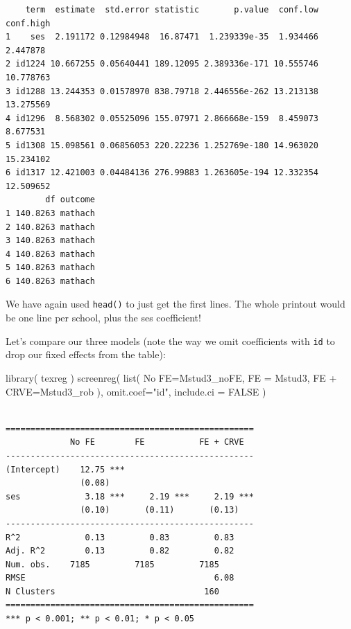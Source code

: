 \documentclass[
  letterpaper,
  DIV=11,
  numbers=noendperiod]{scrreprt}
\newenvironment{Shaded}{\begin{snugshade}}{\end{snugshade}}
\newcommand{\AttributeTok}[1]{\textcolor[rgb]{0.49,0.56,0.16}{#1}}
\newcommand{\ConstantTok}[1]{\textcolor[rgb]{0.53,0.00,0.00}{#1}}
\newcommand{\FunctionTok}[1]{\textcolor[rgb]{0.02,0.16,0.49}{#1}}
\newcommand{\NormalTok}[1]{\textcolor[rgb]{0.00,0.44,0.13}{#1}}
\newcommand{\OtherTok}[1]{\textcolor[rgb]{0.00,0.44,0.13}{#1}}
\newcommand{\StringTok}[1]{\textcolor[rgb]{0.25,0.44,0.63}{#1}}
\begin{document}
\begin{verbatim}
    term  estimate  std.error statistic       p.value  conf.low conf.high
1    ses  2.191172 0.12984948  16.87471  1.239339e-35  1.934466  2.447878
2 id1224 10.667255 0.05640441 189.12095 2.389336e-171 10.555746 10.778763
3 id1288 13.244353 0.01578970 838.79718 2.446556e-262 13.213138 13.275569
4 id1296  8.568302 0.05525096 155.07971 2.866668e-159  8.459073  8.677531
5 id1308 15.098561 0.06856053 220.22236 1.252769e-180 14.963020 15.234102
6 id1317 12.421003 0.04484136 276.99883 1.263605e-194 12.332354 12.509652
        df outcome
1 140.8263 mathach
2 140.8263 mathach
3 140.8263 mathach
4 140.8263 mathach
5 140.8263 mathach
6 140.8263 mathach
\end{verbatim}

We have again used \texttt{head()} to just get the first lines. The
whole printout would be one line per school, plus the ses coefficient!

Let's compare our three models (note the way we omit coefficients with
\texttt{id} to drop our fixed effects from the table):

\begin{Shaded}
\begin{Highlighting}[]
\FunctionTok{library}\NormalTok{( texreg )}
\FunctionTok{screenreg}\NormalTok{( }\FunctionTok{list}\NormalTok{( }\StringTok{\textasciigrave{}}\AttributeTok{No FE}\StringTok{\textasciigrave{}}\OtherTok{=}\NormalTok{Mstud3\_noFE, }\StringTok{\textasciigrave{}}\AttributeTok{FE}\StringTok{\textasciigrave{}} \OtherTok{=}\NormalTok{ Mstud3, }\StringTok{\textasciigrave{}}\AttributeTok{FE + CRVE}\StringTok{\textasciigrave{}}\OtherTok{=}\NormalTok{Mstud3\_rob ), }
           \AttributeTok{omit.coef=}\StringTok{"id"}\NormalTok{,}
           \AttributeTok{include.ci =} \ConstantTok{FALSE}\NormalTok{ )}
\end{Highlighting}
\end{Shaded}

\begin{verbatim}

==================================================
             No FE        FE           FE + CRVE  
--------------------------------------------------
(Intercept)    12.75 ***                          
               (0.08)                             
ses             3.18 ***     2.19 ***     2.19 ***
               (0.10)       (0.11)       (0.13)   
--------------------------------------------------
R^2             0.13         0.83         0.83    
Adj. R^2        0.13         0.82         0.82    
Num. obs.    7185         7185         7185       
RMSE                                      6.08    
N Clusters                              160       
==================================================
*** p < 0.001; ** p < 0.01; * p < 0.05
\end{verbatim}
\end{document}
